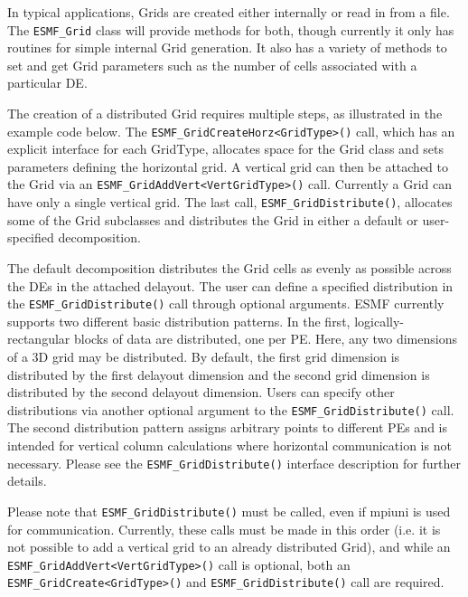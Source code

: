 


In typical applications, Grids are created either internally or read in from
a file.  The {\tt ESMF\_Grid} class will provide methods for both, though 
currently it only has routines for simple internal Grid generation.  It also
has a variety of methods to set and get Grid parameters such as the number of
cells associated with a particular DE.  

The creation of a distributed Grid requires multiple steps, as
illustrated in the example code below.  The {\tt ESMF\_GridCreateHorz<GridType>()}
call, which has an explicit interface for each GridType, allocates space for the
Grid class and sets parameters defining the horizontal grid.  A vertical grid
can then be attached to the Grid via an {\tt ESMF\_GridAddVert<VertGridType>()}
call.  Currently a Grid can have only a single vertical grid.  The last call,
{\tt ESMF\_GridDistribute()}, allocates some of the Grid subclasses and
distributes the Grid in either a default or user-specified decomposition.

The default decomposition distributes the Grid cells as evenly as possible across
the DEs in the attached delayout.  The user can define a specified distribution
in the {\tt ESMF\_GridDistribute()} call through optional arguments.  ESMF
currently supports two different basic distribution patterns.  In the first,
logically-rectangular blocks of data are distributed, one per PE.  Here, any two
dimensions of a 3D grid may be distributed.  By default, the first grid
dimension is distributed by the first delayout dimension and the second grid
dimension is distributed by the second delayout dimension.  Users can specify
other distributions via another optional argument to the {\tt ESMF\_GridDistribute()}
call.  The second distribution pattern assigns arbitrary points to different PEs
and is intended for vertical column calculations where horizontal communication
is not necessary.  Please see the {\tt ESMF\_GridDistribute()} interface
description for further details.

Please note that {\tt ESMF\_GridDistribute()} must be called, even if mpiuni is
used for communication.  Currently, these calls must be made in this order
(i.e. it is not possible to add a vertical grid to an already distributed
Grid), and while an {\tt ESMF\_GridAddVert<VertGridType>()} call is optional,
both an {\tt ESMF\_GridCreate<GridType>()} and {\tt ESMF\_GridDistribute()}
call are required.

